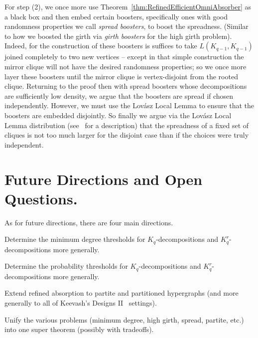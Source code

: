 \documentclass[twoside,leqno]{article}
\begin{document}
For step (2), we once more use Theorem~\ref{thm:RefinedEfficientOmniAbsorber} as a black box and then embed certain boosters, specifically ones with good randomness properties we call \textit{spread boosters}, to boost the spreadness. (Similar to how we boosted the girth via \emph{girth boosters} for the high girth problem). Indeed, for the construction of these boosters is suffices to take $L(K_{q-1},K_{q-1})$ joined completely to two new vertices -- except in that simple construction the mirror clique will not have the desired randomness properties; so we once more layer these boosters until the mirror clique is vertex-disjoint from the rooted clique. Returning to the proof then with spread boosters whose decompositions are sufficiently low density, we argue that the boosters are spread if chosen independently. However, we must use the Lov\'asz Local Lemma to ensure that the boosters are embedded disjointly. So finally we argue via the Lov\'asz Local Lemma distribution (see~\cite{JP22} for a description) that the spreadness of a fixed set of cliques is not too much larger for the disjoint case than if the choices were truly independent. 

\section{Future Directions and Open Questions.}

As for future directions, there are four main directions. 

\begin{problem}
Determine the minimum degree thresholds for $K_q$-decompositions and $K_q^r$-decompositions more generally.   
\end{problem}

\begin{problem}
Determine the probability thresholds for $K_q$-decompositions and $K_q^r$-decompositions more generally.   
\end{problem}

\begin{problem}
Extend refined absorption to partite and partitioned hypergraphs (and more generally to all of Keevash's Designs II~\cite{K18II} settings).
\end{problem}

\begin{problem}
Unify the various problems (minimum degree, high girth, spread, partite, etc.) into one super theorem (possibly with tradeoffs). 
\end{problem}
\end{document}
